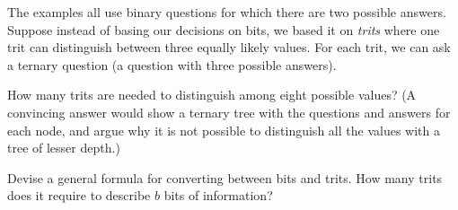 \beforesplitex
\begin{exercise}
The examples all use binary questions for which there are two possible answers.  Suppose instead of basing our decisions on bits, we based it on \emph{trits} where one trit can distinguish between three equally likely values.  For each trit, we can ask a ternary question (a question with three possible answers).
\begin{subexerciselist}
\item \greenstar How many trits are needed to distinguish among eight possible values?  (A convincing answer would show a ternary tree with the questions and answers for each node, and argue why it is not possible to distinguish all the values with a tree of lesser depth.)


\item \goldstar Devise a general formula for converting between bits and trits.  How many trits does it require to describe $b$ bits of information?
\end{subexerciselist}
\end{exercise}
\aftersplitex

